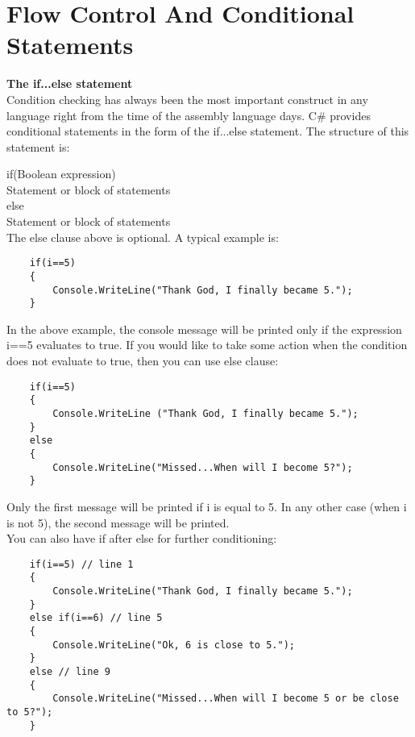 \section{Flow Control And Conditional Statements}

\textbf{The if...else statement}\\
Condition checking has always been the most important construct in any language right from the time of the
assembly language days. C\# provides conditional statements in the form of the if...else statement. The structure of
this statement is:

if(Boolean expression)\\
Statement or block of statements\\
else\\
Statement or block of statements\\


The else clause above is optional. A typical example is:

\begin{lstlisting}
    if(i==5)
    {
        Console.WriteLine("Thank God, I finally became 5.");
    }
\end{lstlisting}

In the above example, the console message will be printed only if the expression i==5 evaluates to true. If you
would like to take some action when the condition does not evaluate to true, then you can use else clause:

\begin{lstlisting}
    if(i==5)
    {
        Console.WriteLine ("Thank God, I finally became 5.");
    }
    else
    {
        Console.WriteLine("Missed...When will I become 5?");
    }
\end{lstlisting}

Only the first message will be printed if i is equal to 5. In any other case (when i is not 5), the second message will
be printed. \\

You can also have if after else for further conditioning:

\begin{lstlisting}
    if(i==5) // line 1
    {
        Console.WriteLine("Thank God, I finally became 5.");
    }
    else if(i==6) // line 5
    {
        Console.WriteLine("Ok, 6 is close to 5.");
    }
    else // line 9
    {
        Console.WriteLine("Missed...When will I become 5 or be close to 5?");
    }
\end{lstlisting}


